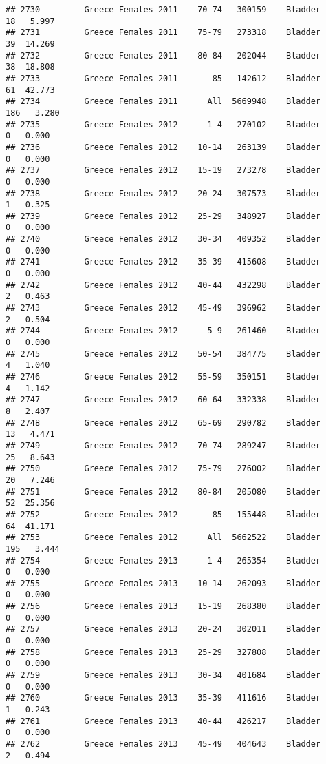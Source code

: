 \documentclass[
]{article}
\begin{document}
\begin{verbatim}
## 2730         Greece Females 2011    70-74   300159    Bladder     18   5.997
## 2731         Greece Females 2011    75-79   273318    Bladder     39  14.269
## 2732         Greece Females 2011    80-84   202044    Bladder     38  18.808
## 2733         Greece Females 2011       85   142612    Bladder     61  42.773
## 2734         Greece Females 2011      All  5669948    Bladder    186   3.280
## 2735         Greece Females 2012      1-4   270102    Bladder      0   0.000
## 2736         Greece Females 2012    10-14   263139    Bladder      0   0.000
## 2737         Greece Females 2012    15-19   273278    Bladder      0   0.000
## 2738         Greece Females 2012    20-24   307573    Bladder      1   0.325
## 2739         Greece Females 2012    25-29   348927    Bladder      0   0.000
## 2740         Greece Females 2012    30-34   409352    Bladder      0   0.000
## 2741         Greece Females 2012    35-39   415608    Bladder      0   0.000
## 2742         Greece Females 2012    40-44   432298    Bladder      2   0.463
## 2743         Greece Females 2012    45-49   396962    Bladder      2   0.504
## 2744         Greece Females 2012      5-9   261460    Bladder      0   0.000
## 2745         Greece Females 2012    50-54   384775    Bladder      4   1.040
## 2746         Greece Females 2012    55-59   350151    Bladder      4   1.142
## 2747         Greece Females 2012    60-64   332338    Bladder      8   2.407
## 2748         Greece Females 2012    65-69   290782    Bladder     13   4.471
## 2749         Greece Females 2012    70-74   289247    Bladder     25   8.643
## 2750         Greece Females 2012    75-79   276002    Bladder     20   7.246
## 2751         Greece Females 2012    80-84   205080    Bladder     52  25.356
## 2752         Greece Females 2012       85   155448    Bladder     64  41.171
## 2753         Greece Females 2012      All  5662522    Bladder    195   3.444
## 2754         Greece Females 2013      1-4   265354    Bladder      0   0.000
## 2755         Greece Females 2013    10-14   262093    Bladder      0   0.000
## 2756         Greece Females 2013    15-19   268380    Bladder      0   0.000
## 2757         Greece Females 2013    20-24   302011    Bladder      0   0.000
## 2758         Greece Females 2013    25-29   327808    Bladder      0   0.000
## 2759         Greece Females 2013    30-34   401684    Bladder      0   0.000
## 2760         Greece Females 2013    35-39   411616    Bladder      1   0.243
## 2761         Greece Females 2013    40-44   426217    Bladder      0   0.000
## 2762         Greece Females 2013    45-49   404643    Bladder      2   0.494

\end{verbatim}
\end{document}
